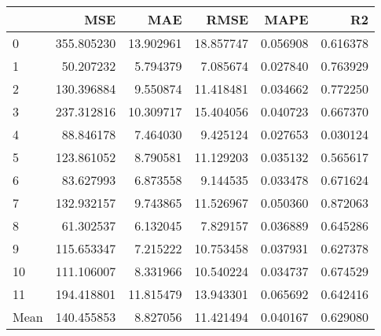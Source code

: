 \begin{tabular}{lrrrrr}
\toprule
 & MSE & MAE & RMSE & MAPE & R2 \\
\midrule
0 & 355.805230 & 13.902961 & 18.857747 & 0.056908 & 0.616378 \\
1 & 50.207232 & 5.794379 & 7.085674 & 0.027840 & 0.763929 \\
2 & 130.396884 & 9.550874 & 11.418481 & 0.034662 & 0.772250 \\
3 & 237.312816 & 10.309717 & 15.404056 & 0.040723 & 0.667370 \\
4 & 88.846178 & 7.464030 & 9.425124 & 0.027653 & 0.030124 \\
5 & 123.861052 & 8.790581 & 11.129203 & 0.035132 & 0.565617 \\
6 & 83.627993 & 6.873558 & 9.144535 & 0.033478 & 0.671624 \\
7 & 132.932157 & 9.743865 & 11.526967 & 0.050360 & 0.872063 \\
8 & 61.302537 & 6.132045 & 7.829157 & 0.036889 & 0.645286 \\
9 & 115.653347 & 7.215222 & 10.753458 & 0.037931 & 0.627378 \\
10 & 111.106007 & 8.331966 & 10.540224 & 0.034737 & 0.674529 \\
11 & 194.418801 & 11.815479 & 13.943301 & 0.065692 & 0.642416 \\
Mean & 140.455853 & 8.827056 & 11.421494 & 0.040167 & 0.629080 \\
\bottomrule
\end{tabular}
